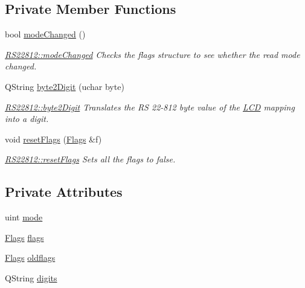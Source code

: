 \subsection*{Private Member Functions}
\begin{DoxyCompactItemize}
\item 
bool \hyperlink{class_r_s22812_a551bff514434f8710316a06c529d1f3c}{mode\-Changed} ()
\begin{DoxyCompactList}\small\item\em \hyperlink{class_r_s22812_a551bff514434f8710316a06c529d1f3c}{R\-S22812\-::mode\-Changed} Checks the flags structure to see whether the read mode changed. \end{DoxyCompactList}\item 
Q\-String \hyperlink{class_r_s22812_aee6ba6536ad3d47239501d812d5db994}{byte2\-Digit} (uchar byte)
\begin{DoxyCompactList}\small\item\em \hyperlink{class_r_s22812_aee6ba6536ad3d47239501d812d5db994}{R\-S22812\-::byte2\-Digit} Translates the R\-S 22-\/812 byte value of the \hyperlink{class_l_c_d}{L\-C\-D} mapping into a digit. \end{DoxyCompactList}\item 
void \hyperlink{class_r_s22812_a64f4658259e355d64dcaaa92eac65e93}{reset\-Flags} (\hyperlink{struct_flags}{Flags} \&f)
\begin{DoxyCompactList}\small\item\em \hyperlink{class_r_s22812_a64f4658259e355d64dcaaa92eac65e93}{R\-S22812\-::reset\-Flags} Sets all the flags to false. \end{DoxyCompactList}\end{DoxyCompactItemize}
\subsection*{Private Attributes}
\begin{DoxyCompactItemize}
\item 
uint \hyperlink{class_r_s22812_a368cc94b2c66bdc6d456e413de9217be}{mode}
\item 
\hyperlink{struct_flags}{Flags} \hyperlink{class_r_s22812_a6c8e4c27f876fdfd10bf153b36bd6254}{flags}
\item 
\hyperlink{struct_flags}{Flags} \hyperlink{class_r_s22812_a167304591d2e351f70975b608718946b}{oldflags}
\item 
Q\-String \hyperlink{class_r_s22812_a4514e9e982441cab9143a9c36a64429c}{digits}
\end{DoxyCompactItemize}


